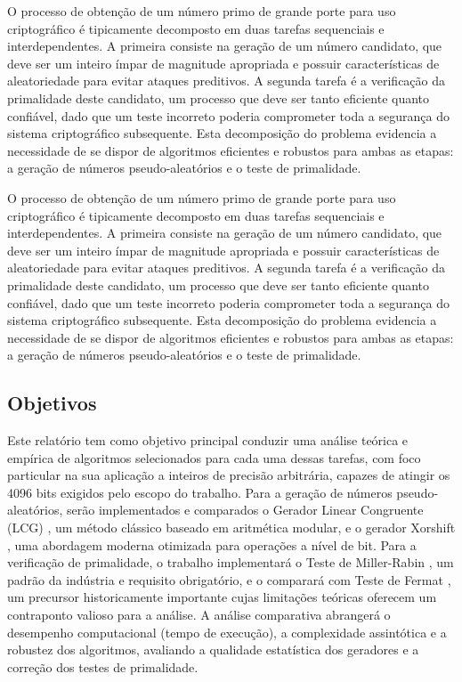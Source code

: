 \documentclass[a4paper, 11pt]{article}
\begin{document}
O processo de obtenção de um número primo de grande porte para uso criptográfico é tipicamente decomposto em duas tarefas sequenciais e interdependentes. A primeira consiste na geração de um número candidato, que deve ser um inteiro ímpar de magnitude apropriada e possuir características de aleatoriedade para evitar ataques preditivos. A segunda tarefa é a verificação da primalidade deste candidato, um processo que deve ser tanto eficiente quanto confiável, dado que um teste incorreto poderia comprometer toda a segurança do sistema criptográfico subsequente. Esta decomposição do problema evidencia a necessidade de se dispor de algoritmos eficientes e robustos para ambas as etapas: a geração de números pseudo-aleatórios e o teste de primalidade.

O processo de obtenção de um número primo de grande porte para uso criptográfico é tipicamente decomposto em duas tarefas sequenciais e interdependentes. A primeira consiste na geração de um número candidato, que deve ser um inteiro ímpar de magnitude apropriada e possuir características de aleatoriedade para evitar ataques preditivos. A segunda tarefa é a verificação da primalidade deste candidato, um processo que deve ser tanto eficiente quanto confiável, dado que um teste incorreto poderia comprometer toda a segurança do sistema criptográfico subsequente. Esta decomposição do problema evidencia a necessidade de se dispor de algoritmos eficientes e robustos para ambas as etapas: a geração de números pseudo-aleatórios e o teste de primalidade.

\subsection{Objetivos}
Este relatório tem como objetivo principal conduzir uma análise teórica e empírica de algoritmos selecionados para cada uma dessas tarefas, com foco particular na sua aplicação a inteiros de precisão arbitrária, capazes de atingir os 4096 bits exigidos pelo escopo do trabalho. Para a geração de números pseudo-aleatórios, serão implementados e comparados o Gerador Linear Congruente (LCG) \parencite{lehmer1951}, um método clássico baseado em aritmética modular, e o gerador Xorshift \parencite{xorshift-def}, uma abordagem moderna otimizada para operações a nível de bit. Para a verificação de primalidade, o trabalho implementará o Teste de Miller-Rabin \parencite{miller1976, rabin1980}, um padrão da indústria e requisito obrigatório, e o comparará com Teste de Fermat \parencite{solovay1977}, um precursor historicamente importante cujas limitações teóricas oferecem um contraponto valioso para a análise. A análise comparativa abrangerá o desempenho computacional (tempo de execução), a complexidade assintótica e a robustez dos algoritmos, avaliando a qualidade estatística dos geradores e a correção dos testes de primalidade.
\end{document}
